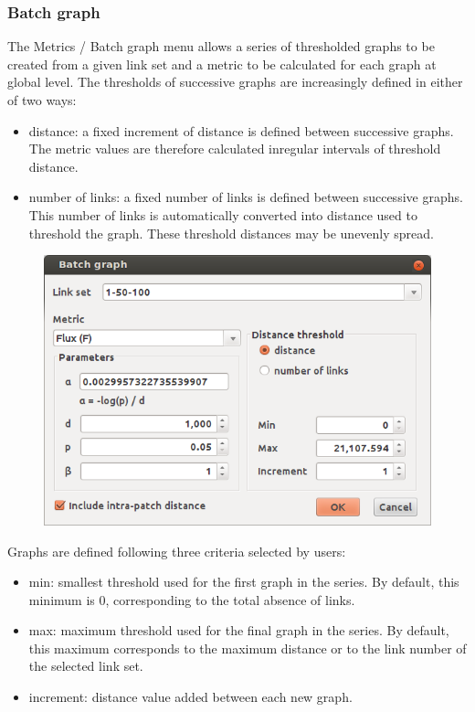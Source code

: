 \documentclass{article}
\begin{document}
\subsubsection{Batch graph}
\label{batch_graph}
The Metrics / Batch graph menu allows a series of thresholded graphs to be created from a given link set and a metric to be calculated for each graph at global level. The thresholds of successive graphs are increasingly defined in either of two ways:
\begin{itemize}
	\item distance: a fixed increment of distance is defined between successive graphs. The metric values are therefore calculated inregular intervals of threshold distance.
	\item number of links: a fixed number of links is defined between successive graphs. This number of links is automatically converted into distance used to threshold the graph. These threshold distances may be unevenly spread.
\end{itemize}

\begin{figure}[H]
	\includegraphics[scale=0.5]{img/manual-en_img11.png}
\end{figure}

Graphs are defined following three criteria selected by users:
\begin{itemize}
	\item min: smallest threshold used for the first graph in the series. By default, this minimum is 0, corresponding to the total absence of links.
	\item max: maximum threshold used for the final graph in the series. By default, this maximum corresponds to the maximum distance or to the link number of the selected link set.
	\item increment: distance value added between each new graph.
\end{itemize}
\end{document}
